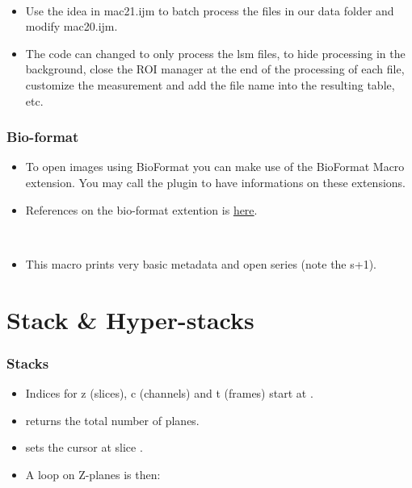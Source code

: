 \begin{frame}
	\begin{example}~\par
		\begin{itemize}
			\item Use the idea in mac21.ijm to batch process the files in our data folder and modify mac20.ijm.
			\item The code can changed to only process the lsm files,  to hide processing in the background, close the ROI manager at the end of the processing of each file, customize the measurement and add the file name into the resulting table, etc.
			
		\end{itemize}
	\end{example}
\end{frame}

\begin{frame}
  \frametitle<presentation>{Bio-format}
  \begin{itemize}
  \item To open images using BioFormat you can make use of the
    BioFormat Macro extension. You may call the plugin to have
    informations on these extensions.
  \item<article> References on the bio-format extention is
    \href{https://www.openmicroscopy.org/site/support/bio-formats5.1/users/imagej/}{here}.
  \end{itemize}
\end{frame}

\begin{frame}
  \begin{example}~\par
    \begin{itemize}
    \item This macro prints very basic metadata and open series (note the s+1).
      
    \end{itemize}
  \end{example}
\end{frame}

\section{Stack \& Hyper-stacks}
\begin{frame}[fragile]
  \frametitle<presentation>{Stacks}
  \begin{itemize}
  \item Indices for z (slices), c (channels) and t (frames) start at .
  \item {} returns the total number of planes.
  \item {} sets the cursor at slice .
  \item A loop on Z-planes is then:\par
    
  \end{itemize}
\end{frame}


